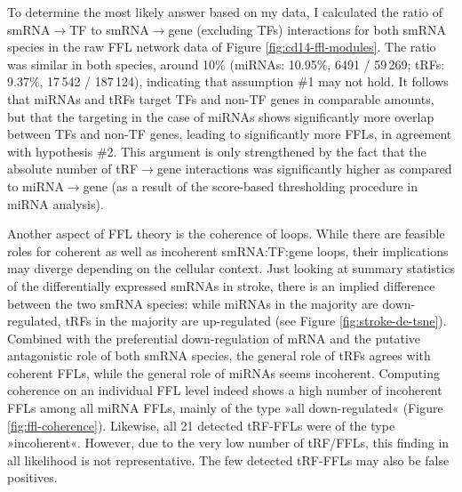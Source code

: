 To determine the most likely answer based on my data, I calculated the ratio of smRNA$\to$TF to smRNA$\to$gene (excluding TFs) interactions for both smRNA species in the raw FFL network data of Figure \ref{fig:cd14-ffl-modules}. The ratio was similar in both species, around 10\% (miRNAs: 10.95\%, 6491 / 59\,269; tRFs: 9.37\%, 17\,542 / 187\,124), indicating that assumption \#1 may not hold. It follows that miRNAs and tRFs target TFs and non-TF genes in comparable amounts, but that the targeting in the case of miRNAs shows significantly more overlap between TFs and non-TF genes, leading to significantly more FFLs, in agreement with hypothesis \#2. This argument is only strengthened by the fact that the absolute number of tRF$\to$gene interactions was significantly higher as compared to miRNA$\to$gene (as a result of the score-based thresholding procedure in miRNA analysis).

Another aspect of FFL theory is the coherence of loops. While there are feasible roles for coherent as well as incoherent smRNA:TF:gene loops, their implications may diverge depending on the cellular context. Just looking at summary statistics of the differentially expressed smRNAs in stroke, there is an implied difference between the two smRNA species: while miRNAs in the majority are down-regulated, tRFs in the majority are up-regulated (see Figure \ref{fig:stroke-de-tsne}). Combined with the preferential down-regulation of mRNA and the putative antagonistic role of both smRNA species, the general role of tRFs agrees with coherent FFLs, while the general role of miRNAs seems incoherent. Computing coherence on an individual FFL level indeed shows a high number of incoherent FFLs among all miRNA FFLs, mainly of the type »all down-regulated« (Figure \ref{fig:ffl-coherence}). Likewise, all 21 detected tRF-FFLs were of the type »incoherent«. However, due to the very low number of tRF\-/FFLs, this finding in all likelihood is not representative. The few detected tRF-FFLs may also be false positives.

